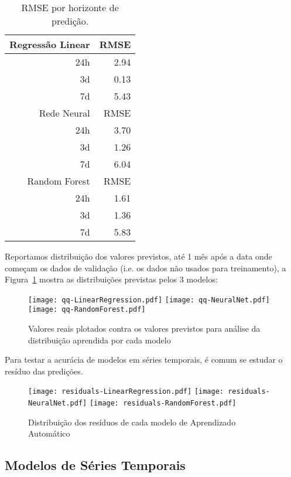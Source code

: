\begin{center}
\begin{table}[htbp]
\caption{RMSE por horizonte de predição.}
\centering
\begin{tabular}{rr}
\hline
 Regressão Linear & RMSE\\
\hline
24h & 2.94\\
3d & 0.13\\
7d & 5.43\\
\hline
Rede Neural & RMSE\\
\hline
24h & 3.70\\
3d & 1.26\\
7d & 6.04\\
\hline
Random Forest & RMSE\\
\hline
24h & 1.61\\
3d & 1.36\\
7d & 5.83\\
\end{tabular}

\label{tb:rmse_lin}
\end{table}
\end{center}

 Reportamos distribuição dos valores previstos, até 1 mês após a data
onde começam os dados de validação (i.e. os dados não usados para treinamento),
a Figura~\ref{fig:distr_lin} mostra as distribuições previstas pelos 3 modelos:

\begin{figure}[H]
\centering
\texttt{[image: qq-LinearRegression.pdf]} \hfill
\texttt{[image: qq-NeuralNet.pdf]} \hfill
\texttt{[image: qq-RandomForest.pdf]} 
\caption{Valores reais plotados contra os valores previstos para análise da distribuição aprendida por cada modelo} 
\label{fig:distr_lin}
\end{figure}

Para testar a acurácia de modelos em séries temporais, é comum se estudar o resíduo das
predições. 

\begin{figure}[H]
  \centering
  \texttt{[image: residuals-LinearRegression.pdf]} \hfill
  \texttt{[image: residuals-NeuralNet.pdf]} \hfill
  \texttt{[image: residuals-RandomForest.pdf]} 
  \caption{Distribuição dos resíduos de cada modelo de Aprendizado Automático}
  \label{fig:res_lin}
\end{figure}

\subsection{Modelos de Séries Temporais}


